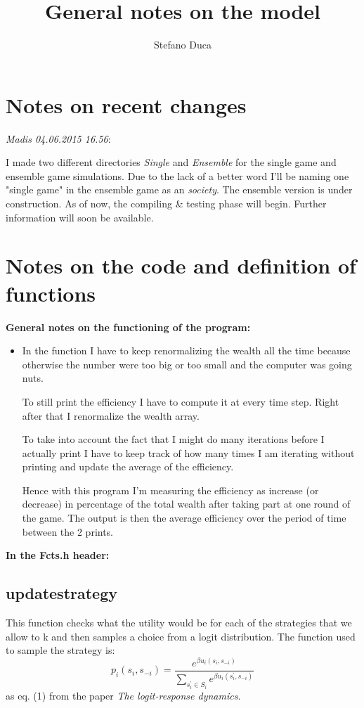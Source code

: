 \documentclass{article}
\author{Stefano Duca}
\title{General notes on the model}
\begin{document}
\maketitle

\section*{Notes on recent changes}

\emph{Madis 04.06.2015 16.56}:

I made two different directories \emph{Single} and \emph{Ensemble} for the single game and ensemble game simulations. Due to the lack of a better word I'll be naming one "single game" in the ensemble game as an \emph{society}. The ensemble version is under construction. As of now, the compiling \& testing phase will begin. Further information will soon be available. 
 

\section*{Notes on the code and definition of functions}
\textbf{General notes on the functioning of the program:}

\begin{itemize}

\item In the function I have to keep renormalizing the wealth all the time because otherwise the number were too big or too small and the computer was going nuts.

To still print the efficiency I have to compute it at every time step. Right after that I renormalize the wealth array.

To take into account the fact that I might do many iterations before I actually print I have to keep track of how many times I am iterating without printing and update the average of the efficiency.

Hence with this program I'm measuring the efficiency as increase (or decrease) in percentage of the total wealth after taking part at one round of the game.
The output is then the average efficiency over the period of time between the 2 prints.

\end{itemize}


\textbf{In the Fcts.h header:}

\subsection*{updatestrategy}
This function checks what the utility would be for each of the strategies that we allow to k and then samples a choice from a logit distribution.
The function used to sample the strategy is:
$$ p_{i}\left(s_{i},s_{-i}\right)=\frac{e^{\beta u_{i}\left(s_{i},s_{-i}\right)}}{\sum_{s_{i}^{'}\in S_{i}}e^{\beta u_{i}\left(s_{i}^{'},s_{-i}\right)}} $$
as eq. (1) from the paper \textit{The logit-response dynamics}.
\end{document}
